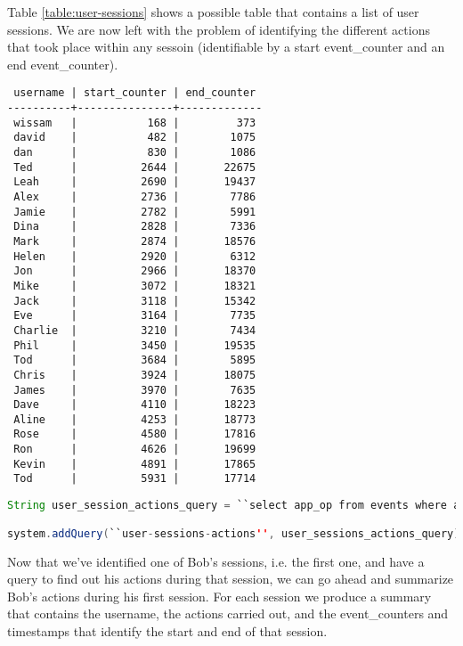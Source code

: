 Table \ref{table:user-sessions} shows a possible table that contains a list of user sessions. We are now left with the problem of identifying the different actions that took place within any sessoin (identifiable by a start event\_counter and an end event\_counter).

\begin{table}
\begin{verbatim}
 username | start_counter | end_counter 
----------+---------------+-------------
 wissam   |           168 |         373
 david    |           482 |        1075
 dan      |           830 |        1086
 Ted      |          2644 |       22675
 Leah     |          2690 |       19437
 Alex     |          2736 |        7786
 Jamie    |          2782 |        5991
 Dina     |          2828 |        7336
 Mark     |          2874 |       18576
 Helen    |          2920 |        6312
 Jon      |          2966 |       18370
 Mike     |          3072 |       18321
 Jack     |          3118 |       15342
 Eve      |          3164 |        7735
 Charlie  |          3210 |        7434
 Phil     |          3450 |       19535
 Tod      |          3684 |        5895
 Chris    |          3924 |       18075
 James    |          3970 |        7635
 Dave     |          4110 |       18223
 Aline    |          4253 |       18773
 Rose     |          4580 |       17816
 Ron      |          4626 |       19699
 Kevin    |          4891 |       17865
 Tod      |          5931 |       17714
\end{verbatim}
\caption*{User Sessions Table}
\caption[User Sessions]{This table shows start and end event counters for different user sessions. Start and end times are omitted for simplicity.}
\label{table:user-sessions}
\end{table}

\begin{lstlisting}[language=Java]
String user_session_actions_query = ``select app_op from events where app_op like 'mint-user-\%' and to_array(app_args)[0] = ? and event_counter > ? and event_counter < ?'';

system.addQuery(``user-sessions-actions'', user_sessions_actions_query);
\end{lstlisting}

Now that we've identified one of Bob's sessions, i.e. the first one, and have a query to find out his actions during that session, we can go ahead and summarize Bob's actions during his first session. For each session we produce a summary that contains the username, the actions carried out, and the event\_counters and timestamps that identify the start and end of that session.

